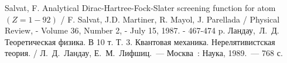 \begin{thebibliography}{10}
 Salvat, F. Analytical Dirac-Hartree-Fock-Slater screening 
function for atom $(Z=1-92)$ / F. Salvat, J.D. Martiner, R. Mayol, J. 
Parellada / Physical Review, - Volume 36, Number 2, - July 15, 1987. - 
467-474 p.
 Ландау,~Л.~Д. Теоретическая физика. В 10 т. Т. 3. Квантовая механика. Нерелятивистская теория. / Л.~Д.~Ландау, Е.~М.~Лифшиц.~--- Москва~: Наука, 1989.~--- 768 с.
\end{thebibliography}
\newpage 
\appendix

